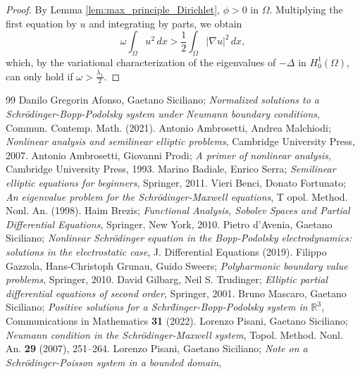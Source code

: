 \documentclass[10pt,a4paper]{amsart}
\numberwithin{equation}{section}
\begin{document}
\begin{proof}
By Lemma \ref{lem:max_principle_Dirichlet}, $\phi > 0$ in $\Omega$. 
Multiplying the first equation by $u$ and integrating by parts, we obtain
\[
 \omega \int_\Omega u^2 \,dx > \frac{1}{2} \int_\Omega |\nabla u|^2 \,dx,
\]
which, by the variational characterization of the eigenvalues of $- \Delta$ 
in $H_0^1(\Omega)$, can only hold if $\omega > \frac{\lambda_1}{2}$.
\end{proof}

\begin{thebibliography}{99}
 Danilo Gregorin Afonso, Gaetano Siciliano;
\emph{Normalized solutions to a {S}chr\"odinger-{B}opp-{P}odolsky system under
{N}eumann boundary conditions},
 Commun. Contemp. Math. (2021).
 Antonio Ambrosetti, Andrea Malchiodi;
\emph{Nonlinear analysis and semilinear elliptic problems}, 
Cambridge University Press, 2007.
 Antonio Ambrosetti, Giovanni Prodi;
\emph{A primer of nonlinear analysis},
 Cambridge University Press, 1993.
 Marino Badiale, Enrico Serra;
\emph{Semilinear elliptic equations for beginners}, Springer, 2011.
 Vieri Benci, Donato Fortunato;
\emph{An eigenvalue problem for the {{S}}chr\"odinger-{{M}}axwell equations}, T
 opol. Method. Nonl. An. (1998).
 Haim Brezis;
\emph{Functional Analysis, Sobolev Spaces and Partial
 Differential Equations}, Springer, New York, 2010.
 Pietro d'Avenia, Gaetano Siciliano;
\emph{Nonlinear Schr\"odinger equation
 in the {B}opp-{P}odolsky electrodynamics: solutions in the electrostatic
 case}, J. Differential Equations (2019).
 Filippo Gazzola, Hans-Christoph Grunau, Guido Sweers;
\emph{Polyharmonic boundary value problems}, Springer, 2010.
 David Gilbarg, Neil S. Trudinger;
\emph{Elliptic partial differential equations of second order}, Springer, 2001.
 Bruno Mascaro, Gaetano Siciliano;
\emph{Positive solutions for a {S}chr\"dinger-{B}opp-{P}odolsky system in $\mathbb {R}^{3}$},
Communications in Mathematics \textbf{31} (2022).
 Lorenzo Pisani, Gaetano Siciliano;
\emph{Neumann condition in the
 {S}chr\"odinger-{M}axwell system}, Topol. Method. Nonl. An. \textbf{29}
 (2007), 251--264.
 Lorenzo Pisani, Gaetano Siciliano;
\emph{Note on a {S}chr\"odinger-{P}oisson system in a bounded domain},

\end{thebibliography}
\end{document}

